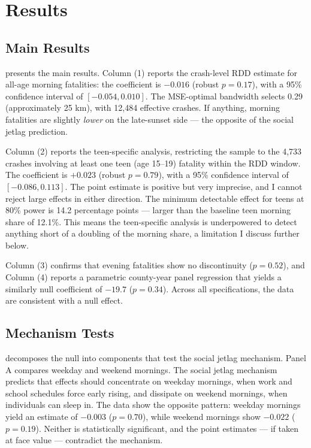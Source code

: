 \documentclass[12pt]{article}
\begin{document}
\section{Results}

\subsection{Main Results}



 presents the main results. Column (1) reports the crash-level RDD estimate for all-age morning fatalities: the coefficient is $-0.016$ (robust $p = 0.17$), with a 95\% confidence interval of $[-0.054, 0.010]$. The MSE-optimal bandwidth selects 0.29\textdegree{} (approximately 25 km), with 12,484 effective crashes. If anything, morning fatalities are slightly \textit{lower} on the late-sunset side --- the opposite of the social jetlag prediction.

Column (2) reports the teen-specific analysis, restricting the sample to the 4,733 crashes involving at least one teen (age 15--19) fatality within the RDD window. The coefficient is $+0.023$ (robust $p = 0.79$), with a 95\% confidence interval of $[-0.086, 0.113]$. The point estimate is positive but very imprecise, and I cannot reject large effects in either direction. The minimum detectable effect for teens at 80\% power is 14.2 percentage points --- larger than the baseline teen morning share of 12.1\%. This means the teen-specific analysis is underpowered to detect anything short of a doubling of the morning share, a limitation I discuss further below.

Column (3) confirms that evening fatalities show no discontinuity ($p = 0.52$), and Column (4) reports a parametric county-year panel regression that yields a similarly null coefficient of $-19.7$ ($p = 0.34$). Across all specifications, the data are consistent with a null effect.

\subsection{Mechanism Tests}



 decomposes the null into components that test the social jetlag mechanism. Panel A compares weekday and weekend mornings. The social jetlag mechanism predicts that effects should concentrate on weekday mornings, when work and school schedules force early rising, and dissipate on weekend mornings, when individuals can sleep in. The data show the opposite pattern: weekday mornings yield an estimate of $-0.003$ ($p = 0.70$), while weekend mornings show $-0.022$ ($p = 0.19$). Neither is statistically significant, and the point estimates --- if taken at face value --- contradict the mechanism.
\end{document}
